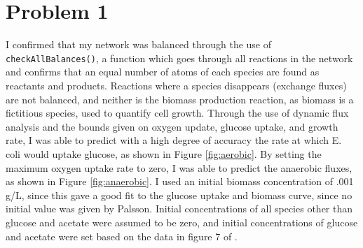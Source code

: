 \documentclass{article}
\begin{document}
 
\section*{Problem 1}
I confirmed that my network was balanced through the use of \texttt{checkAllBalances()}, a function which goes through all reactions in the network and confirms that an equal number of atoms of each species are found as reactants and products. Reactions where a species disappears (exchange fluxes) are not balanced, and neither is the biomass production reaction, as biomass is a fictitious species, used to quantify cell growth. Through the use of dynamic flux analysis and the bounds given on oxygen update, glucose uptake, and growth rate, I was able to predict with a high degree of accuracy the rate at which E. coli would uptake glucose, as shown in Figure \ref{fig:aerobic}. By setting the maximum oxygen uptake rate to zero, I was able to predict the anaerobic fluxes, as shown in Figure \ref{fig:anaerobic}. I used an initial biomass concentration of .001 g/L, since this gave a good fit to the glucose uptake and biomass curve, since no initial value was given by Palsson. Initial concentrations of all species other than glucose and acetate were assumed to be zero, and initial concentrations of glucose and acetate were set based on the data in figure 7 of \cite{varma1994stoichiometric}.
\end{document}
